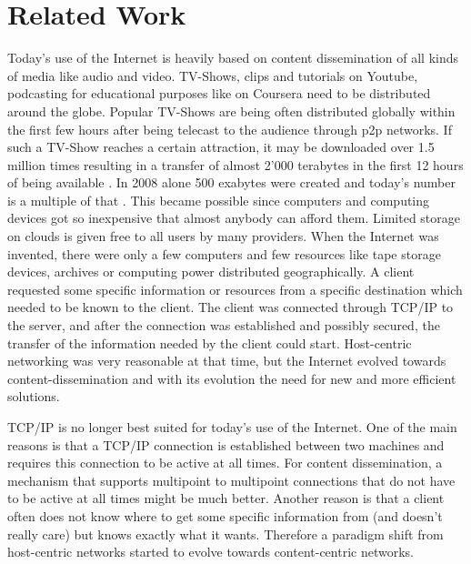 \chapter{Related Work}

Today's use of the Internet is heavily based on content dissemination of all kinds of media like audio and video. TV-Shows, clips and tutorials on Youtube, podcasting for educational purposes like on Coursera need to be distributed around the globe. Popular TV-Shows are being often distributed globally within the first few hours after being telecast to the audience through p2p networks. If such a TV-Show reaches a certain attraction, it may be downloaded over 1.5 million times resulting in a transfer of almost 2'000 terabytes in the first 12 hours of being available \cite{forbes14}. In 2008 alone 500 exabytes were created and today's number is a multiple of that \cite{gantz07}. This became possible since computers and computing devices got so inexpensive that almost anybody can afford them. Limited storage on clouds is given free to all users by many providers. When the Internet was invented, there were only a few computers and few resources like tape storage devices, archives or computing power distributed geographically. A client requested some specific information or resources from a specific destination which needed to be known to the client. The client was connected through TCP/IP to the server, and after the connection was established and possibly secured, the transfer of the information needed by the client could start. Host-centric networking was very reasonable at that time, but the Internet evolved towards content-dissemination and with its evolution the need for new and more efficient solutions.

\vspace{5mm} %

TCP/IP is no longer best suited for today's use of the Internet. One of the main reasons is that a TCP/IP connection is established between two machines and requires this connection to be active at all times. For content dissemination, a mechanism that supports multipoint to multipoint connections that do not have to be active at all times might be much better. Another reason is that a client often does not know where to get some specific information from (and doesn't really care) but knows exactly what it wants. Therefore a paradigm shift from host-centric networks started to evolve towards content-centric networks.

\newpage

